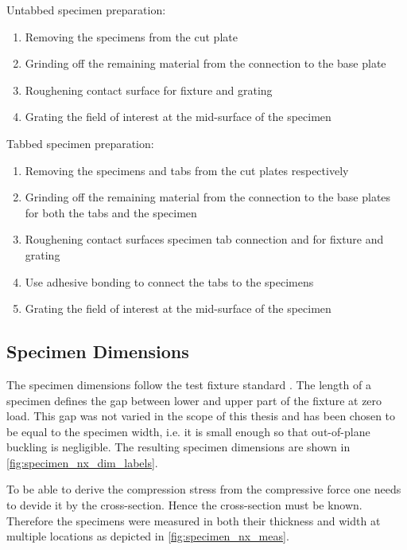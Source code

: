 \begin{minipage}[t]{\dimexpr(\distTextWidth-\distColSep)/2\relax}
    Untabbed specimen preparation:
    \begin{enumerate}
        \item Removing the specimens from the cut plate 
        \item Grinding off the remaining material from the connection to the base plate
        \item Roughening contact surface for fixture and grating
        \item Grating the field of interest at the mid-surface of the specimen
    \end{enumerate}
\end{minipage}%
\hfill%
\noindent
\begin{minipage}[t]{\dimexpr(\distTextWidth-\distColSep)/2\relax}
    Tabbed specimen preparation:
    \begin{enumerate}
        \item Removing the specimens and tabs from the cut plates respectively
        \item Grinding off the remaining material from the connection to the base plates for both the tabs and the specimen
        \item Roughening contact surfaces specimen tab connection and for fixture and grating
        \item Use adhesive bonding to connect the tabs to the specimens
        \item Grating the field of interest at the mid-surface of the specimen
    \end{enumerate}
\end{minipage}

\subsection{Specimen Dimensions}
\label{subsec:spec_dim}

The specimen dimensions follow the test fixture standard \cite{D6641standard}. The length of a specimen defines the gap between lower and upper part of the fixture at zero load. This gap was not varied in the scope of this thesis and has been chosen to be equal to the specimen width, i.e. it is small enough so that out-of-plane buckling is negligible. The resulting specimen dimensions are shown in \autoref{fig:specimen_nx_dim_labels}.

To be able to derive the compression stress from the compressive force one needs to devide it by the cross-section. Hence the cross-section must be known. Therefore the specimens were measured in both their thickness and width at multiple locations as depicted in \autoref{fig:specimen_nx_meas}.

